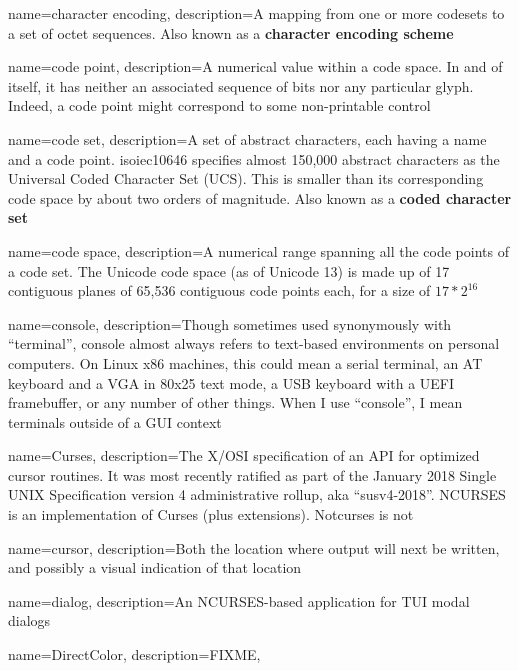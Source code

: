 {
  name={character encoding},
  description={A mapping from one or more \glspl{codeset} to a set of octet
  sequences. Also known as a \textbf{character encoding scheme}\cite{rfc2978}}
}

{
  name={code point},
description={A numerical value within a code space. In and of itself,
  it has neither an associated sequence of bits nor any particular glyph.
  Indeed, a code point might correspond to some non-printable control}
}

{
  name={code set},
description={A set of abstract characters, each having a name and a code
  point. \Gls{isoiec10646} specifies almost 150,000 abstract characters as the
  Universal Coded Character Set (UCS). This is smaller than its corresponding
  code space by about two orders of magnitude. Also known as a
  \textbf{coded character set}\cite{rfc2978}}
}

{
  name={code space},
description={A numerical range spanning all the code points of a code set.
  The Unicode code space (as of Unicode 13) is made up of 17 contiguous
  planes of 65,536 contiguous code points each, for a size of $17*2^{16}$}
}

{
  name={console},
description={Though sometimes used synonymously with ``terminal'', console almost
  always refers to text-based environments on personal computers. On Linux
  x86 machines, this could mean a serial terminal, an AT keyboard and a VGA
  in 80x25 text mode, a USB keyboard with a UEFI framebuffer, or any number
  of other things. When I use ``console'', I mean terminals outside of a GUI
  context}
}

{
  name={Curses},
description={The X/OSI specification of an API for optimized cursor routines. It
  was most recently ratified as part of the January 2018 Single UNIX
  Specification version 4 administrative rollup, aka ``susv4-2018''. NCURSES is
  an implementation of Curses (plus extensions). Notcurses is not}
}

{
  name={cursor},
description={Both the location where output will next be written, and possibly
  a visual indication of that location}
}

{
  name={dialog},
description={An NCURSES-based application for TUI modal dialogs}
}

{
  name={DirectColor},
  description={FIXME},
}


